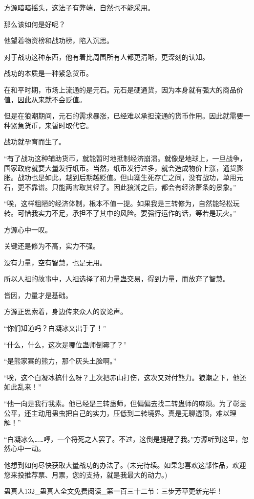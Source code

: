 \begin{this_body}
方源暗暗摇头，这法子有弊端，自然也不能采用。

那么该如何是好呢？

他望着物资榜和战功榜，陷入沉思。

对于战功这种东西，他有着比周围所有人都更清晰，更深刻的认知。

战功的本质是一种紧急货币。

在和平时期，市场上流通的是元石。元石是硬通货，因为本身就有强大的商品价值，因此从来就不会贬值。

但是在狼潮期间，元石的需求暴涨，已经难以承担流通的货币作用。因此就需要一种紧急货币，来暂时取代它。

战功就孕育而生了。

“有了战功这种辅助货币，就能暂时地抵制经济崩溃。就像是地球上，一旦战争，国家政府就要大量发行纸币。当然，纸币发行过多，就会造成物价上涨，通货膨胀。战功也是如此，越到后期越贬值。但山寨生死存亡之间，没有战功，单用元石，更不靠谱。只能两害取其轻了。因此狼潮之后，都会有经济萧条的景象。”

“唉，这样粗陋的经济体制，根本不值一提。如果我是三转修为，自然能轻松玩转。可惜我实力不足，承担不了其中的风险。要强行运作的话，等若是玩火。”

方源心中一叹。

关键还是修为不高，实力不强。

没有力量，空有智慧，也是无用。

所以人祖的故事中，人祖选择了和力量蛊交易，得到力量，而放弃了智慧。

皆因，力量才是基础。

方源正思索着，身边传来众人的议论声。

“你们知道吗？白凝冰又出手了！”

“什么，什么，这次是哪位蛊师倒霉了？”

“是熊家寨的熊力，那个灰头土脸啊。”

“唉，这个白凝冰搞什么呀？上次把赤山打伤，这次又对付熊力。狼潮之下，他还如此乱来！”

“他一向是我行我素。他已经是三转蛊师，但偏偏去找二转蛊师的麻烦。为了彰显公平，还主动用蛊虫把自己的实力，压低到二转境界。真是无聊透顶，难以理解！”

“白凝冰么……哼，一个将死之人罢了。不过，这倒是提醒了我。”方源听到这里，忽然心中一动。

他想到如何尽快获取大量战功的办法了。(未完待续。如果您喜欢这部作品，欢迎您来投推荐票、月票，您的支持，就是我最大的动力。)

蛊真人132\_蛊真人全文免费阅读\_第一百三十二节：三步芳草更新完毕！

\end{this_body}

